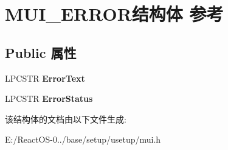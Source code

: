 \hypertarget{struct_m_u_i___e_r_r_o_r}{}\section{M\+U\+I\+\_\+\+E\+R\+R\+O\+R结构体 参考}
\label{struct_m_u_i___e_r_r_o_r}
\subsection*{Public 属性}
\begin{DoxyCompactItemize}
\item 
\mbox{\label{struct_m_u_i___e_r_r_o_r_a6e169a65cbd0fa732562c48ea01e52d3}} 
L\+P\+C\+S\+TR {\bfseries Error\+Text}
\item 
\mbox{\label{struct_m_u_i___e_r_r_o_r_ad962f7a0ba6a1b35993f76b9bb458b4d}} 
L\+P\+C\+S\+TR {\bfseries Error\+Status}
\end{DoxyCompactItemize}


该结构体的文档由以下文件生成\+:\begin{DoxyCompactItemize}
\item 
E\+:/\+React\+O\+S-\/0../base/setup/usetup/mui.\+h\end{DoxyCompactItemize}

